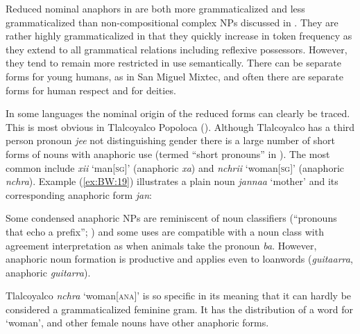 \documentclass[output=collectionpaper]{langsci/langscibook}
\begin{document}
Reduced nominal anaphors in  are both more grammaticalized and less grammaticalized than non-compositional complex NPs discussed in . They are rather highly grammaticalized in that they quickly increase in token frequency as they extend to all grammatical relations including reflexive possessors. However, they tend to remain more restricted in use semantically. There can be separate forms for young humans, as in San Miguel Mixtec, and often there are separate forms for human respect and for deities.

In some languages the nominal origin of the reduced forms can clearly be traced. This is most obvious in Tlalcoyalco Popoloca (\citealt{Stark2011}). Although Tlalcoyalco  has a third person pronoun \textit{je\textquotesingle e} not distinguishing gender there is a large number of short forms of nouns with anaphoric use (termed “short pronouns” in \citealt[3]{Stark2011}). The most common include \textit{xii} ‘man[\textsc{sg}]’ (anaphoric \textit{xa}) and \textit{nchrii} ‘woman[\textsc{sg}]’ (anaphoric \textit{nchra}). Example (\ref{ex:BW:19}) illustrates a plain noun \textit{janna\textquotesingle a} ‘mother’ and its corresponding anaphoric form \textit{jan}:

%

Some condensed anaphoric NPs are reminiscent of noun classifiers (“pronouns that echo a prefix”; \citealt[4]{Stark2011}) and some uses are compatible with a noun class with agreement interpretation as when animals take the pronoun \textit{ba}. However, anaphoric noun formation is productive and applies even to  loanwords (\textit{guitaarra}, anaphoric \textit{guitarra}).

Tlalcoyalco  \textit{nchra} ‘woman[\textsc{ana}]’ is so specific in its meaning that it can hardly be considered a grammaticalized feminine gram. It has the distribution of a word for ‘woman’, and other female nouns have other anaphoric forms.
\end{document}

